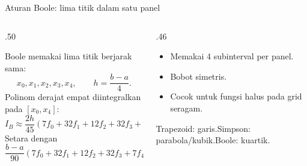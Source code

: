 \documentclass[aspectratio=169,10pt]{beamer}
\begin{document}
\begin{frame}{Aturan Boole: lima titik dalam satu panel}
\scriptsize
\begin{columns}[T,totalwidth=\textwidth]
\begin{column}{.50\textwidth}
\begin{bluebox}
Boole memakai lima titik berjarak sama:
\[
x_0,x_1,x_2,x_3,x_4,
\qquad h=\frac{b-a}{4}.
\]
Polinom derajat empat diintegralkan pada $[x_0,x_4]$:
\[
\boxed{I_B\approx\frac{2h}{45}\left(7f_0+32f_1+12f_2+32f_3+7f_4\right)}.
\]
Setara dengan
\[
\frac{b-a}{90}(7f_0+32f_1+12f_2+32f_3+7f_4).
\]
\end{bluebox}
\end{column}
\begin{column}{.46\textwidth}
\begin{orangebox}[Karakter]
\begin{itemize}\setlength\itemsep{1pt}
\item Memakai 4 subinterval per panel.
\item Bobot simetris.
\item Cocok untuk fungsi halus pada grid seragam.
\end{itemize}
\end{orangebox}
\begin{greenbox}
Trapezoid: garis.\quad Simpson: parabola/kubik.\quad Boole: kuartik.
\end{greenbox}
\end{column}
\end{columns}
\end{frame}
\end{document}
